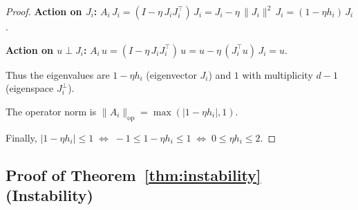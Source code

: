 \documentclass[11pt,a4paper]{article}
\theoremstyle{definition}
\theoremstyle{remark}
\begin{document}
\begin{proof}
\textbf{Action on $J_i$:}\;
$A_i\, J_i = (I - \eta\, J_i J_i^\top)\, J_i
= J_i - \eta\,\|J_i\|^2\, J_i = (1 - \eta h_i)\, J_i$.

\textbf{Action on $u \perp J_i$:}\;
$A_i\, u = (I - \eta\, J_i J_i^\top)\, u = u - \eta\,(J_i^\top u)\, J_i = u$.

Thus the eigenvalues are $1 - \eta h_i$ (eigenvector $J_i$) and $1$ with
multiplicity $d - 1$ (eigenspace $J_i^\perp$).

The operator norm is
$\|A_i\|_{\mathrm{op}} = \max(|1 - \eta h_i|, 1)$.

Finally,
$|1 - \eta h_i| \leq 1
\;\Leftrightarrow\; -1 \leq 1 - \eta h_i \leq 1
\;\Leftrightarrow\; 0 \leq \eta h_i \leq 2$.
\end{proof}

\subsection{Proof of Theorem~\ref{thm:instability} (Instability)}
\end{document}
